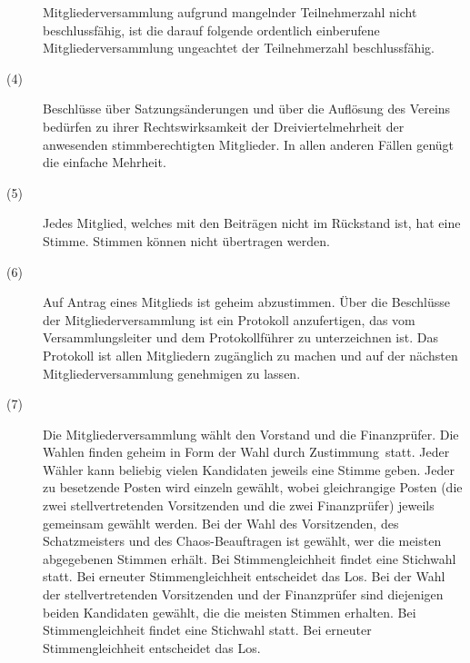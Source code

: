 \documentclass[12pt,paper=a4,ngerman]{scrreprt}
\begin{document}
\begin{description}
Mitgliederversammlung aufgrund mangelnder Teilnehmerzahl nicht
beschlussfähig, ist die darauf folgende ordentlich einberufene
Mitgliederversammlung ungeachtet der Teilnehmerzahl beschlussfähig.
\item[(4)]
Beschlüsse über Satzungsänderungen und über die Auflösung des Vereins
bedürfen zu ihrer Rechtswirksamkeit der Dreiviertelmehrheit der
anwesenden stimmberechtigten Mitglieder. In allen anderen Fällen
genügt die einfache Mehrheit.
\item[(5)]
Jedes Mitglied, welches mit den Beiträgen nicht im Rückstand ist, hat
eine Stimme. Stimmen können nicht übertragen werden.
\item[(6)]
Auf Antrag eines Mitglieds ist geheim abzustimmen. Über die Beschlüsse
der Mitgliederversammlung ist ein Protokoll anzufertigen, das vom
Versammlungsleiter und dem Protokollführer zu unterzeichnen ist. Das
Protokoll ist allen Mitgliedern zugänglich zu machen und auf der
nächsten Mitgliederversammlung genehmigen zu lassen.
\item[(7)]
Die Mitgliederversammlung wählt den Vorstand und die Finanzprüfer. Die
Wahlen finden geheim in Form der \glqq Wahl durch Zustimmung\grqq\
statt. Jeder Wähler kann beliebig vielen Kandidaten jeweils eine
Stimme geben. Jeder zu besetzende Posten wird einzeln gewählt, wobei
gleichrangige Posten (die zwei stellvertretenden Vorsitzenden und die
zwei Finanzprüfer) jeweils gemeinsam gewählt werden. Bei der Wahl des
Vorsitzenden, des Schatzmeisters und des Chaos-Beauftragen ist
gewählt, wer die meisten abgegebenen Stimmen erhält. Bei
Stimmengleichheit findet eine Stichwahl statt. Bei erneuter
Stimmengleichheit entscheidet das Los. Bei der Wahl der
stellvertretenden Vorsitzenden und der Finanzprüfer sind diejenigen
beiden Kandidaten gewählt, die die meisten Stimmen erhalten. Bei
Stimmengleichheit findet eine Stichwahl statt. Bei erneuter
Stimmengleichheit entscheidet das Los.
\end{description}
\end{document}
